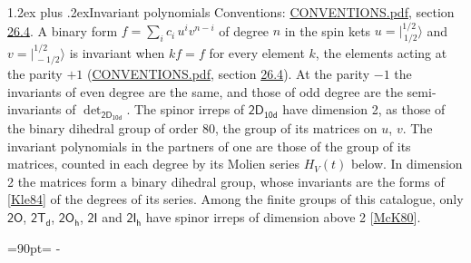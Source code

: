 \documentclass[10pt,a4paper]{article}
\makeatletter
\renewcommand\section{\@startsection{section}{1}{\z@}{-3ex plus -1ex minus -.2ex}%
  {1.2ex plus .2ex}{\normalfont\large\sffamily\bfseries\color{parttitle}}}
\newcommand{\needspace}[1]{\par\penalty-100\begingroup\dimen0=#1\relax\dimen2=\pagegoal
  \advance\dimen2-\pagetotal\ifdim\dimen0>\dimen2\relax\ifdim\dimen2>0pt\vfil\break\fi\fi
  \endgroup}
\numberwithin{equation}{section}
\newcommand{\grp}[1]{\mathsf{#1}}
\newcommand{\jm}[2]{\bigl\lvert{}^{#1}_{\,#2}\bigr\rangle}
\makeatother
\begin{document}
\section{Invariant polynomials}\label{s:invariants}
Conventions: \href{../../CONVENTIONS.pdf}{CONVENTIONS.pdf}, section \href{../../CONVENTIONS.pdf\#conv.26.4}{26.4}.
\leavevmode\label{n:local.binary.form}A binary form $f = \sum_i c_i\, u^i v^{n-i}$ of degree $n$ in the spin kets $u = \jm{1/2}{1/2}$ and $v = \jm{1/2}{-1/2}$ is invariant when $k f = f$ for every element $k$, the elements acting at the parity $+1$ (\href{../../CONVENTIONS.pdf}{CONVENTIONS.pdf}, section \href{../../CONVENTIONS.pdf\#conv.26.4}{26.4}). At the parity $-1$ the invariants of even degree are the same, and those of odd degree are the semi-invariants of $\det_{\grp{2D_{10d}}}$.
The spinor irreps of $\grp{2D_{10d}}$ have dimension 2, as those of the binary dihedral group of order 80, the group of its matrices on $u$, $v$. \label{n:function.hilbert}The invariant polynomials in the partners of one are those of the group of its matrices, counted in each degree by its Molien series $H_V(t)$ below. In dimension 2 the matrices form a binary dihedral group, whose invariants are the forms of [\href{../../../REFERENCES.pdf\#ref.Kle84}{Kle84}] of the degrees of its series. Among the finite groups of this catalogue, only $\grp{2O}$, $\grp{2T_{d}}$, $\grp{2O_{h}}$, $\grp{2I}$ and $\grp{2I_{h}}$ have spinor irreps of dimension above 2 [\href{../../../REFERENCES.pdf\#ref.McK80}{McK80}].
\needspace{90pt}
\end{document}
